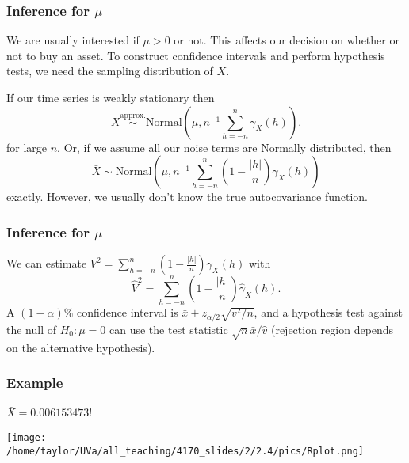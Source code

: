 \documentclass{beamer}
\begin{document}


\begin{frame}
\frametitle{Inference for $\mu$}

We are usually interested if $\mu > 0$ or not. This affects our decision on whether or not to buy an asset. To construct confidence intervals and perform hypothesis tests, we need the sampling distribution of $\bar{X}$.
\newline

If our time series is weakly stationary then 
\[
\bar{X} \overset{\text{approx.}}{\sim} \text{Normal}\left(\mu, n^{-1} \sum_{h=-n}^n  \gamma_X(h)\right).
\]
for large $n$. Or, if we assume all our noise terms are Normally distributed, then 
\[
\bar{X} \sim \text{Normal}\left(\mu, n^{-1} \sum_{h=-n}^n \left(1 - \frac{|h|}{n} \right) \gamma_X(h)\right)
\]
exactly. However, we usually don't know the true autocovariance function.
\end{frame}



\begin{frame}
\frametitle{Inference for $\mu$}

We can estimate $V^2 = \sum_{h=-n}^n \left(1 - \frac{|h|}{n} \right) \gamma_X(h)$ with 
\[
\hat{V}^2 = \sum_{h=-n}^n \left(1 - \frac{|h|}{n} \right) \hat{\gamma}_X(h).
\]
A $(1-\alpha)$\% confidence interval is $\bar{x} \pm z_{\alpha/2}\sqrt{v^2/n}$, and a hypothesis test against the null of $H_0: \mu = 0$ can use the test statistic $\sqrt{n}\bar{x}/\hat{v}$ (rejection region depends on the alternative hypothesis).


\end{frame}



\begin{frame}
\frametitle{Example}
$\bar{X} = 0.006153473$!

\begin{center}
\texttt{[image: /home/taylor/UVa/all\_teaching/4170\_slides/2/2.4/pics/Rplot.png]}
\end{center}

\end{frame}

\end{document}
